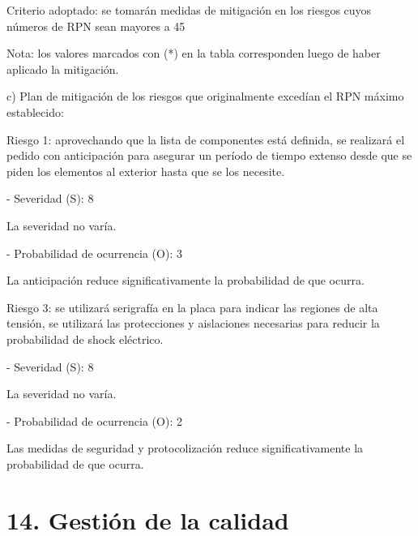 \documentclass[
11pt, %
codirector, %
]{charter}
\begin{document}
Criterio adoptado:
se tomarán medidas de mitigación en los riesgos cuyos números de RPN sean mayores a 45

Nota: los valores marcados con (*) en la tabla corresponden luego de haber aplicado la mitigación.

c) Plan de mitigación de los riesgos que originalmente excedían el RPN máximo establecido:

Riesgo 1: aprovechando que la lista de componentes está definida, se realizará el pedido con anticipación para asegurar un período de tiempo extenso desde que se piden los elementos al exterior hasta que se los necesite.

- Severidad (S): 8

La severidad no varía.

- Probabilidad de ocurrencia (O): 3

La anticipación reduce significativamente la probabilidad de que ocurra.

Riesgo 3: se utilizará serigrafía en la placa para indicar las regiones de alta tensión, se utilizará las protecciones y aislaciones necesarias para reducir la probabilidad de shock eléctrico.

- Severidad (S): 8

La severidad no varía.

- Probabilidad de ocurrencia (O): 2

Las medidas de seguridad y protocolización reduce significativamente la probabilidad de que ocurra.


\section{14. Gestión de la calidad}
\label{sec:calidad}
\end{document}
